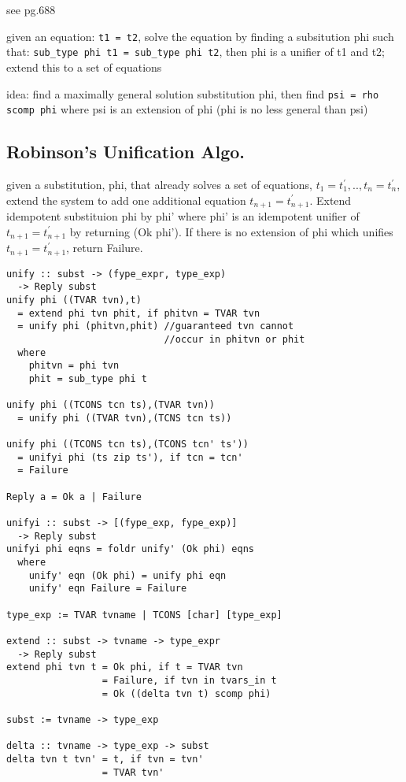 \documentclass[8pt]{extarticle}
\begin{document}
\begin{multicols*}{2}
see \cite{grune2012} pg.688

given an equation: \verb|t1 = t2|, solve the equation by finding a subsitution phi such that: \verb|sub_type phi t1 = sub_type phi t2|, then phi is a unifier of t1 and t2; extend this to a set of equations

idea: find a maximally general solution substitution phi, then find \verb|psi = rho scomp phi| where psi is an extension of phi (phi is no less general than psi)

\vfill\null
\columnbreak

\subsection{Robinson's Unification Algo.}
given a substitution, phi, that already solves a set of equations, $t_1=t_1^{\prime}, .., t_n=t_n^{\prime}$, extend the system to add one additional equation $t_{n+1}=t_{n+1}^{\prime}$. Extend idempotent substituion phi by phi' where phi' is an idempotent unifier of $t_{n+1}=t_{n+1}^{\prime}$ by returning (Ok phi'). If there is no extension of phi which unifies $t_{n+1}=t_{n+1}^{\prime}$, return Failure.

\begin{verbatim}
unify :: subst -> (fype_expr, type_exp)
  -> Reply subst
unify phi ((TVAR tvn),t)
  = extend phi tvn phit, if phitvn = TVAR tvn
  = unify phi (phitvn,phit) //guaranteed tvn cannot
                            //occur in phitvn or phit
  where
    phitvn = phi tvn
    phit = sub_type phi t

unify phi ((TCONS tcn ts),(TVAR tvn))
  = unify phi ((TVAR tvn),(TCNS tcn ts))

unify phi ((TCONS tcn ts),(TCONS tcn' ts'))
  = unifyi phi (ts zip ts'), if tcn = tcn'
  = Failure

Reply a = Ok a | Failure

unifyi :: subst -> [(fype_exp, fype_exp)]
  -> Reply subst
unifyi phi eqns = foldr unify' (Ok phi) eqns
  where
    unify' eqn (Ok phi) = unify phi eqn
    unify' eqn Failure = Failure

type_exp := TVAR tvname | TCONS [char] [type_exp]

extend :: subst -> tvname -> type_expr
  -> Reply subst
extend phi tvn t = Ok phi, if t = TVAR tvn
                 = Failure, if tvn in tvars_in t
                 = Ok ((delta tvn t) scomp phi)

subst := tvname -> type_exp

delta :: tvname -> type_exp -> subst
delta tvn t tvn' = t, if tvn = tvn'
                 = TVAR tvn'


\end{verbatim}
\end{multicols*}
\end{document}
